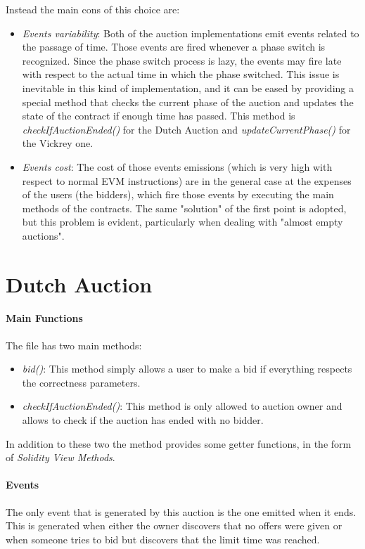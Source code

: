 \documentclass[11pt, a4paper]{report}
\begin{document}
	Instead the main cons of this choice are:
	\begin{itemize}
		\item \emph{Events variability}: Both of the auction implementations emit events related to the passage of time. Those events are fired whenever a phase switch is recognized. Since the phase switch process is lazy, the events may fire late with respect to the actual time in which the phase switched. This issue is inevitable in this kind of implementation, and it can be eased by providing a special method that checks the current phase of the auction and updates the state of the contract if enough time has passed. This method is \emph{checkIfAuctionEnded()} for the Dutch Auction and \emph{updateCurrentPhase()} for the Vickrey one.
		\item \emph{Events cost}: The cost of those events emissions (which is very high with respect to normal EVM instructions) are in the general case at the expenses of the users (the bidders), which fire those events by executing the main methods of the contracts. The same "solution" of the first point is adopted, but this problem is evident, particularly when dealing with "almost empty auctions".
	\end{itemize}

\section*{Dutch Auction}
\label{sec:dutchAuction}

	\paragraph*{Main Functions}
	The file has two main methods:
	\begin{itemize}
		\item \emph{bid()}: This method simply allows a user to make a bid if everything respects the correctness parameters. 
		\item \emph{checkIfAuctionEnded()}: This method is only allowed to auction owner and allows to check if the auction has ended with no bidder.
	\end{itemize}
	In addition to these two the method provides some getter functions, in the form of \emph{Solidity View Methods}.
	
	\paragraph*{Events}
	The only  event that is generated by this auction is the one emitted when it ends. This is generated when either the owner discovers that no offers were given or when someone tries to bid but discovers that the limit time was reached.
	
\end{document}
